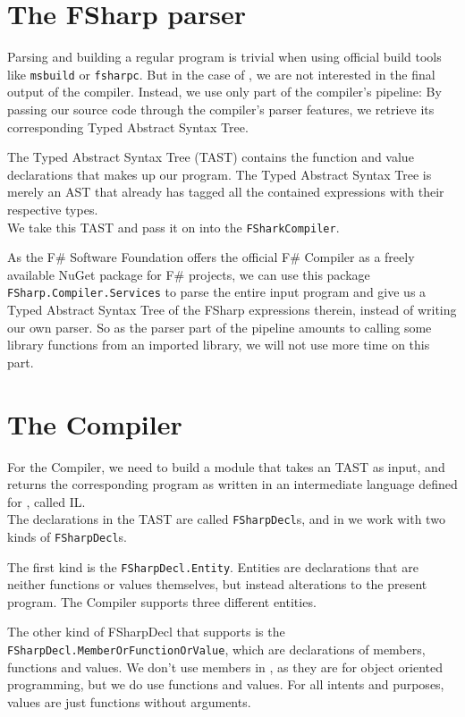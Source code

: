 \section{The FSharp parser}
Parsing and building a regular \fsharp{} program is trivial when using official build tools like
\texttt{msbuild} or \texttt{fsharpc}.
But in the case of \fshark{}, we are not interested in the final output of the
\fsharp{} compiler. Instead, we use only part of the \fsharp{} compiler's
pipeline: By passing our \fshark{} source code through the \fsharp{} compiler's
parser features, we retrieve its corresponding Typed Abstract Syntax Tree.

The Typed Abstract Syntax Tree (TAST) contains the function and value declarations that makes up 
our \fshark{} program.
The Typed Abstract Syntax Tree is merely an AST that already has tagged all the
contained expressions with their respective types.\\
We take this TAST and pass it on into the \texttt{FSharkCompiler}.

As the F\# Software Foundation offers the official F\# Compiler as a freely
available NuGet package for F\# projects, we can use this package
\texttt{FSharp.Compiler.Services} to parse the entire input \fshark{} program and
give us a Typed Abstract Syntax Tree of the FSharp expressions therein, instead
of writing our own parser. So as the \fsharp{} parser part of the pipeline amounts to calling some library
functions from an imported library, we will not use more time on this part.

\section{The \fshark{}Compiler}
For the \fshark{}Compiler, we need to build a module that takes an \fsharp{}
TAST as input, and returns the corresponding program as written in an
intermediate language defined for \fshark{}, called \fshark{}IL.\\
The declarations in the TAST are called \texttt{FSharpDecl}s, and in \fshark{}
we work with two kinds of \texttt{FSharpDecl}s.

The first kind is the \texttt{FSharpDecl.Entity}. Entities are \fsharp{}
declarations that are neither functions or values
themselves, but instead alterations to the present \fsharp{} program. 
The \fshark{}Compiler supports three different entities.

The other kind of FSharpDecl that \fshark{} supports is the \texttt{FSharpDecl.MemberOrFunctionOrValue}, which are
declarations of members, functions and values. We don't use members in
\fshark{}, as they are for object oriented \fsharp{} programming, but we do use
functions and values. For all intents and purposes, \fsharp{} values are just
functions without arguments.

